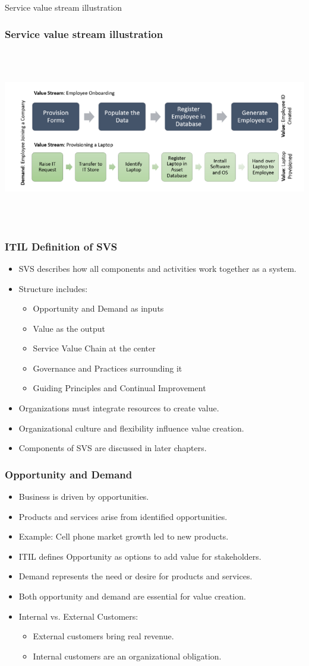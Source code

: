 \documentclass[aspectratio=169, table]{beamer}
\begin{document}
\begin{frame}{Service value stream illustration} 	 \frametitle{ Service value stream illustration} \begin{center} 	\includegraphics[width=0.6\linewidth]{images/image-02.png} \end{center} \end{frame}

\begin{frame}
	\frametitle{ITIL Definition of SVS}
	\begin{itemize}
		\item SVS describes how all components and activities work together as a system.
		\item Structure includes:
		\begin{itemize}
			\item Opportunity and Demand as inputs
			\item Value as the output
			\item Service Value Chain at the center
			\item Governance and Practices surrounding it
			\item Guiding Principles and Continual Improvement
		\end{itemize}
		\item Organizations must integrate resources to create value.
		\item Organizational culture and flexibility influence value creation.
		\item Components of SVS are discussed in later chapters.
	\end{itemize}
\end{frame}

\begin{frame}
	\frametitle{Opportunity and Demand}
	\begin{itemize}
		\item Business is driven by opportunities.
		\item Products and services arise from identified opportunities.
		\item Example: Cell phone market growth led to new products.
		\item ITIL defines Opportunity as options to add value for stakeholders.
		\item Demand represents the need or desire for products and services.
		\item Both opportunity and demand are essential for value creation.
		\item Internal vs. External Customers:
		\begin{itemize}
			\item External customers bring real revenue.
			\item Internal customers are an organizational obligation.
		\end{itemize}
	\end{itemize}
\end{frame}
\end{document}
